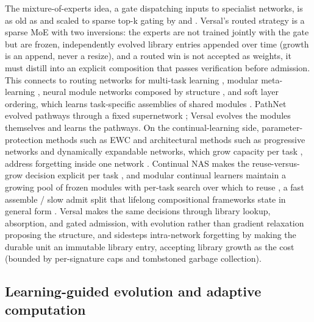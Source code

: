 \documentclass[11pt]{article}
\begin{document}
The mixture-of-experts idea, a gate dispatching inputs to specialist networks, is as old as \citet{jacobs1991} and scaled to sparse top-k gating by \citet{shazeer2017} and \citet{fedus2022}. Versal's routed strategy is a sparse MoE with two inversions: the experts are not trained jointly with the gate but are frozen, independently evolved library entries appended over time (growth is an append, never a resize), and a routed win is not accepted as weights, it must distill into an explicit composition that passes verification before admission. This connects to routing networks for multi-task learning \citep{rosenbaum2018}, modular meta-learning \citep{alet2018}, neural module networks composed by structure \citep{andreas2016}, and soft layer ordering, which learns task-specific assemblies of shared modules \citep{meyerson2018}. PathNet evolved pathways through a fixed supernetwork \citep{fernando2017}; Versal evolves the modules themselves and learns the pathways. On the continual-learning side, parameter-protection methods such as EWC \citep{kirkpatrick2017} and architectural methods such as progressive networks \citep{rusu2016} and dynamically expandable networks, which grow capacity per task \citep{yoon2018}, address forgetting inside one network \citep{parisi2019}. Continual NAS makes the reuse-versus-grow decision explicit per task \citep{li2019}, and modular continual learners maintain a growing pool of frozen modules with per-task search over which to reuse \citep{veniat2021}, a fast assemble / slow admit split that lifelong compositional frameworks state in general form \citep{mendez2021}. Versal makes the same decisions through library lookup, absorption, and gated admission, with evolution rather than gradient relaxation proposing the structure, and sidesteps intra-network forgetting by making the durable unit an immutable library entry, accepting library growth as the cost (bounded by per-signature caps and tombstoned garbage collection).

\subsection{Learning-guided evolution and adaptive computation}
\end{document}
